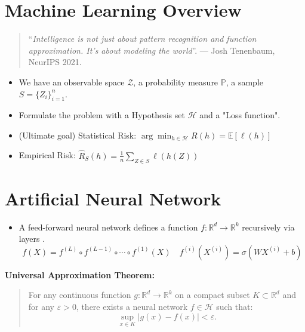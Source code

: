 \documentclass{antclass}
\begin{document}
\section{Machine Learning Overview}
\begin{quote}
	 “\textit{Intelligence is not just about pattern recognition and function approximation. It’s about	modeling the world}”. — Josh Tenenbaum, NeurIPS 2021.
\end{quote}
	\begin{itemize}
		\item We have an observable space \(\mathcal{Z}\), a probability measure \(\mathbb{P}\), a sample \(S=\{Z_i\}_{i=1}^n\).
		\item Formulate the problem with a Hypothesis set \(\mathcal{H}\) and a "Loss function".
		\item (Ultimate goal) Statistical Risk: \(\arg\min_{h\in\mathcal{H}} R(h) = \mathbb{E}[\ell(h)]\)
		\item Empirical Risk: \(\hat{R}_S(h) = \frac{1}{n} \sum_{Z \in S} \ell(h(Z))  \)
	\end{itemize}
	
\section{Artificial Neural Network}

	\begin{itemize}
		\item A feed-forward neural network defines a function $f:\mathbb{R}^d\rightarrow \mathbb{R}^k$ recursively via layers .
		\[f(X) = f^{(L)}\circ f^{(L-1)}\circ \cdots \circ f^{(1)}(X) \quad f^{(i)}(X^{(i)})= \sigma(WX^{(i)}+b) \]
	\end{itemize}
	
	\textbf{Universal Approximation Theorem:}
	\begin{quote}
		\small For any continuous function $g:\mathbb{R}^d\rightarrow \mathbb{R}^k$ on a compact subset $K\subset \mathbb{R}^d$ and for any $\varepsilon>0$, there exists a neural network $f\in \mathcal{H}$ such that:
		\[
		\sup_{x\in K} \big|g(x)-f(x)\big| < \varepsilon.
		\]
	\end{quote}
\end{document}
